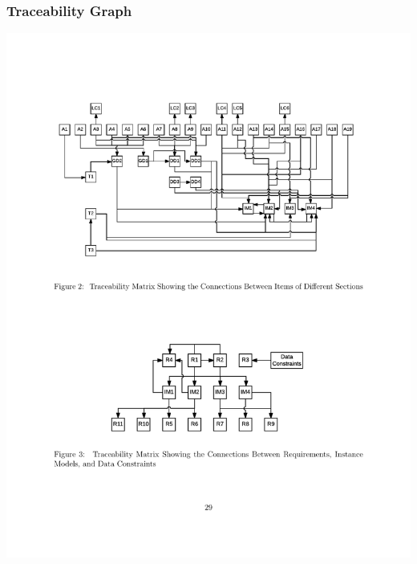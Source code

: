 \documentclass[t,12pt,numbers,fleqn]{beamer}
\begin{document}
\begin{frame}

\frametitle{Traceability Graph}

\begin{center}
\includegraphics[scale=0.7]{../Figures/TraceGraph.pdf}
\end{center}

\end{frame}



\end{document}

